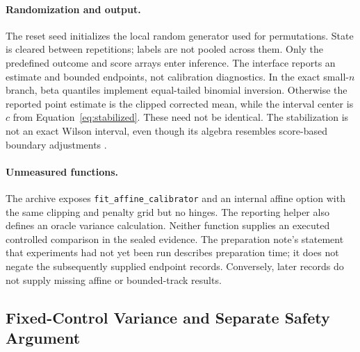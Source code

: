 \documentclass{article}
\begin{document}
\paragraph{Randomization and output.}
The reset seed initializes the local random generator used for permutations. State is cleared between repetitions; labels are not pooled across them. Only the predefined outcome and score arrays enter inference. The interface reports an estimate and bounded endpoints, not calibration diagnostics. In the exact small-$n$ branch, beta quantiles implement equal-tailed binomial inversion. Otherwise the reported point estimate is the clipped corrected mean, while the interval center is $c$ from Equation~\ref{eq:stabilized}. These need not be identical. The stabilization is not an exact Wilson interval, even though its algebra resembles score-based boundary adjustments \citep{Newcombe1998,AgrestiCoull1998}.

\paragraph{Unmeasured functions.}
The archive exposes \texttt{fit\_affine\_calibrator} and an internal affine option with the same clipping and penalty grid but no hinges. The reporting helper also defines an oracle variance calculation. Neither function supplies an executed controlled comparison in the sealed evidence. The preparation note's statement that experiments had not yet been run describes preparation time; it does not negate the subsequently supplied endpoint records. Conversely, later records do not supply missing affine or bounded-track results.

\subsection{Fixed-Control Variance and Separate Safety Argument}
\label{sec:theory}
\end{document}
